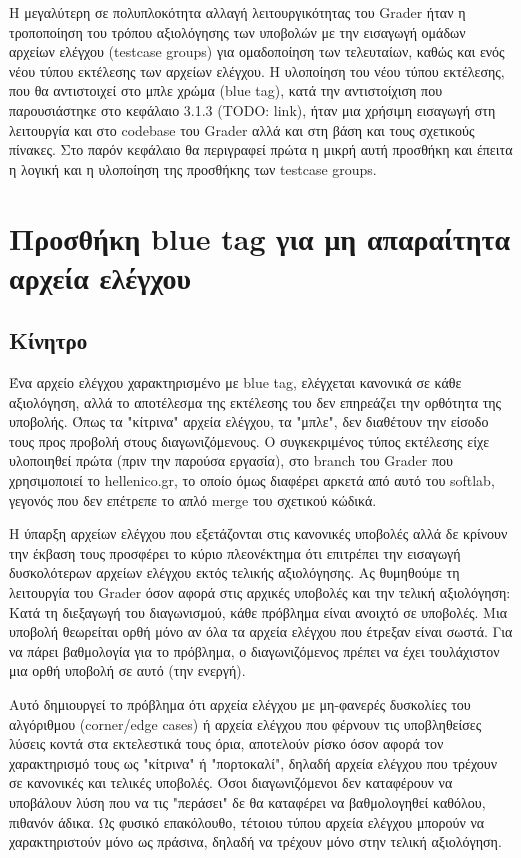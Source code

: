 \documentclass[diploma]{softlab-thesis}
\begin{document}
Η μεγαλύτερη σε πολυπλοκότητα αλλαγή λειτουργικότητας του Grader ήταν η
τροποποίηση του τρόπου αξιολόγησης των υποβολών με την εισαγωγή ομάδων αρχείων
ελέγχου (testcase groups) για ομαδοποίηση των τελευταίων, καθώς και ενός νέου
τύπου εκτέλεσης των αρχείων ελέγχου. Η υλοποίηση του νέου τύπου εκτέλεσης, που
θα αντιστοιχεί στο μπλε χρώμα (blue tag), κατά την αντιστοίχιση που
παρουσιάστηκε στο κεφάλαιο 3.1.3 (TODO: link), ήταν μια χρήσιμη εισαγωγή στη
λειτουργία και στο codebase του Grader αλλά και στη βάση και τους σχετικούς
πίνακες. Στο παρόν κεφάλαιο θα περιγραφεί πρώτα η μικρή αυτή προσθήκη και
έπειτα η λογική και η υλοποίηση της προσθήκης των testcase groups.


\section{Προσθήκη blue tag για μη απαραίτητα αρχεία ελέγχου}

\subsection{Κίνητρο}

Ένα αρχείο ελέγχου χαρακτηρισμένο με blue tag, ελέγχεται κανονικά σε κάθε
αξιολόγηση, αλλά το αποτέλεσμα της εκτέλεσης του δεν επηρεάζει την ορθότητα της
υποβολής. Όπως τα "κίτρινα" αρχεία ελέγχου, τα "μπλε", δεν διαθέτουν την είσοδο
τους προς προβολή στους διαγωνιζόμενους. Ο συγκεκριμένος τύπος εκτέλεσης είχε
υλοποιηθεί πρώτα (πριν την παρούσα εργασία), στο branch του Grader που
χρησιμοποιεί το hellenico.gr, το οποίο όμως διαφέρει αρκετά από αυτό του softlab,
γεγονός που δεν επέτρεπε το απλό merge του σχετικού κώδικά.


\bigskip

Η ύπαρξη αρχείων ελέγχου που εξετάζονται στις κανονικές υποβολές αλλά δε
κρίνουν την έκβαση τους προσφέρει το κύριο πλεονέκτημα ότι επιτρέπει την
εισαγωγή δυσκολότερων αρχείων ελέγχου εκτός τελικής αξιολόγησης. Ας θυμηθούμε
τη λειτουργία του Grader όσον αφορά στις αρχικές υποβολές και την τελική
αξιολόγηση: Κατά τη διεξαγωγή του διαγωνισμού, κάθε πρόβλημα είναι ανοιχτό σε
υποβολές. Μια υποβολή θεωρείται ορθή μόνο αν όλα τα αρχεία ελέγχου που έτρεξαν
είναι σωστά. Για να πάρει βαθμολογία για το πρόβλημα, ο διαγωνιζόμενος πρέπει
να έχει τουλάχιστον μια ορθή υποβολή σε αυτό (την ενεργή).

\bigskip

Αυτό δημιουργεί το πρόβλημα ότι αρχεία ελέγχου με μη-φανερές δυσκολίες του
αλγόριθμου (corner/edge cases) ή αρχεία ελέγχου που φέρνουν τις υποβληθείσες
λύσεις κοντά στα εκτελεστικά τους όρια, αποτελούν ρίσκο όσον αφορά τον
χαρακτηρισμό τους ως "κίτρινα" ή "πορτοκαλί", δηλαδή αρχεία ελέγχου που τρέχουν
σε κανονικές και τελικές υποβολές. Όσοι διαγωνιζόμενοι δεν καταφέρουν να
υποβάλουν λύση που να τις "περάσει" δε θα καταφέρει να βαθμολογηθεί καθόλου,
πιθανόν άδικα. Ως φυσικό επακόλουθο, τέτοιου τύπου αρχεία ελέγχου μπορούν να
χαρακτηριστούν μόνο ως πράσινα, δηλαδή να τρέχουν μόνο στην τελική αξιολόγηση.
\end{document}
